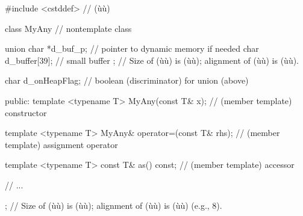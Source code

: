 %
%
%
%
%
%
%
%
\begin{emcppslisting}
#include <cstddef>  // (ù{}ù)

class MyAny  // nontemplate class
{
    union {
        char *d_buf_p;       // pointer to dynamic memory if needed
        char  d_buffer[39];  // small buffer
    };  // Size of (ù{}ù) is (ù{}ù); alignment of (ù{}ù) is (ù{}ù).

    char d_onHeapFlag;             // boolean (discriminator) for union (above)

public:
    template <typename T>
    MyAny(const T& x);               // (member template) constructor

    template <typename T>
    MyAny& operator=(const T& rhs);  // (member template) assignment operator

    template <typename T>
    const T& as() const;             // (member template) accessor

    // ...

};  // Size of (ù{}ù) is (ù{}ù); alignment of (ù{}ù) is (ù{}ù) (e.g., 8).
\end{emcppslisting}


